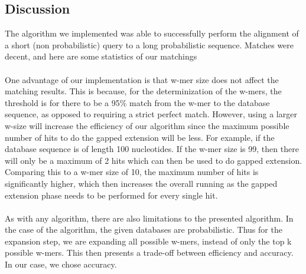 \documentclass{article}
\begin{document}
\subsection*{Discussion}
The algorithm we implemented was able to successfully perform the alignment of a short (non probabilistic) query to a long probabilistic sequence. Matches were decent, and here are some statistics of our matchings\\
\\
One advantage of our implementation is that w-mer size does not affect the matching results. This is because, for the determinization of the w-mers, the threshold is for there to be a 95$\%$ match from the w-mer to the database sequence, as opposed to requiring a strict perfect match. However, using a larger w-size will increase the efficiency of our algorithm since the maximum possible number of hits to do the gapped extension will be less. For example, if the database sequence is of length 100 nucleotides. If the w-mer size is 99, then there will only be a maximum of 2 hits which can then be used to do gapped extension. Comparing this to a w-mer size of 10, the maximum number of hits is significantly higher, which then increases the overall running as the gapped extension phase needs to be performed for every single hit.\\
\\
As with any algorithm, there are also limitations to the presented algorithm. In the case of the algorithm, the given databases are probabilistic. Thus for the expansion step, we are expanding all possible w-mers, instead of only the top k possible w-mers. This then presents a trade-off between efficiency and accuracy. In our case, we chose accuracy. 
\end{document}
